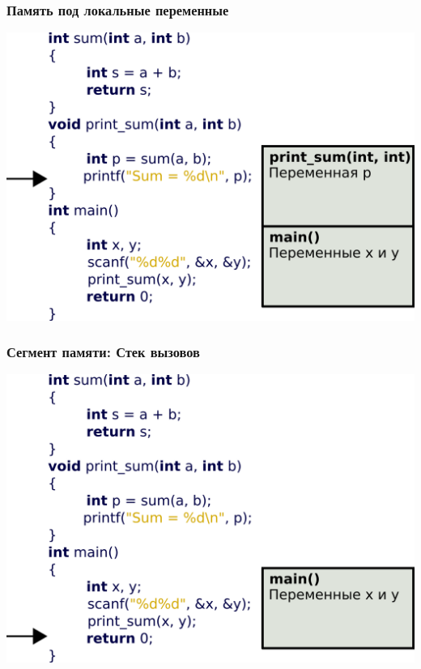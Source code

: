 \documentclass[12pt,pdf,hyperref={unicode}]{beamer}
\begin{document}
\begin{frame}[fragile]
\frametitle{Память под локальные переменные} 
\begin{center}
\includegraphics[width=\linewidth]{images/v_stack6.png}
\end{center}
\end{frame}

\begin{frame}[fragile]
\frametitle{Сегмент памяти: Стек вызовов} 
\begin{center}
\includegraphics[width=\linewidth]{images/v_stack7.png}
\end{center}
\end{frame}
\end{document}

